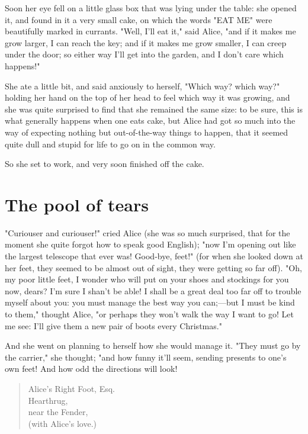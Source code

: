Soon her eye fell on a little glass box that was lying under the table: she opened it, and found in it a very small cake, on which the words "EAT ME" were beautifully marked in currants. "Well, I'll eat it," said Alice, "and if it makes me grow larger, I can reach the key; and if it makes me grow smaller, I can creep under the door; so either way I'll get into the garden, and I don't care which happens!"

She ate a little bit, and said anxiously to herself, "Which way? which way?" holding her hand on the top of her head to feel which way it was growing, and she was quite surprised to find that she remained the same size: to be sure, this is what generally happens when one eats cake, but Alice had got so much into the ​way of expecting nothing but out-of-the-way things to happen, that it seemed quite dull and stupid for life to go on in the common way.

So she set to work, and very soon finished off the cake.

\quebra\chapter*{The pool of tears}

"Curiouser and curiouser!" cried Alice (she was so much surprised, that for the moment she quite forgot how to speak good English); "now I'm opening out like the largest telescope that ever was! Good-bye, feet!" (for when she looked down at her feet, they seemed to be almost out of sight, they were getting so far off). "Oh, my poor little feet, I wonder ​who will put on your shoes and stockings for you now, dears? I'm sure I shan't be able! I shall be a great deal too far off to trouble myself about you: you must manage the best way you can;—but I must be kind to them," thought Alice, "or perhaps they won't walk the way I want to go! Let me see: I'll give them a new pair of boots every Christmas."

And she went on planning to herself how she would manage it. "They must go by the carrier," she thought; "and how funny it'll seem, sending presents to one's own feet! And how odd the directions will look!

\begin{quote}
Alice's Right Foot, Esq.\\
Hearthrug,\\
near the Fender,\\
(with Alice's love.)
\end{quote}

